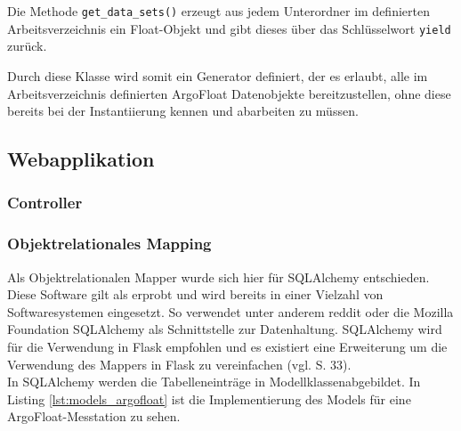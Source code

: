 Die Methode \texttt{get\_data\_sets()} erzeugt aus jedem Unterordner im definierten Arbeitsverzeichnis ein Float-Objekt und gibt dieses über das Schlüsselwort \texttt{yield} zurück. 

Durch diese Klasse wird somit ein Generator definiert, der es erlaubt, alle im Arbeitsverzeichnis definierten ArgoFloat Datenobjekte bereitzustellen, ohne diese bereits bei der Instantiierung kennen und abarbeiten zu müssen.





\subsection{Webapplikation}

\subsubsection{Controller}


\subsubsection{Objektrelationales Mapping}


Als Objektrelationalen Mapper wurde sich hier für SQLAlchemy entschieden. Diese Software gilt als erprobt und wird bereits in einer Vielzahl von Softwaresystemen eingesetzt. So verwendet unter anderem reddit oder die Mozilla Foundation SQLAlchemy als Schnittstelle zur Datenhaltung. SQLAlchemy wird für die Verwendung in Flask empfohlen und es existiert eine Erweiterung um die Verwendung des Mappers in Flask zu vereinfachen (vgl. \cite{openingtheflask} S. 33). \\


In SQLAlchemy werden die Tabelleneinträge in Modellklassenabgebildet. In Listing \ref{lst:models_argofloat} ist die Implementierung des Models für eine ArgoFloat-Messtation zu sehen.

